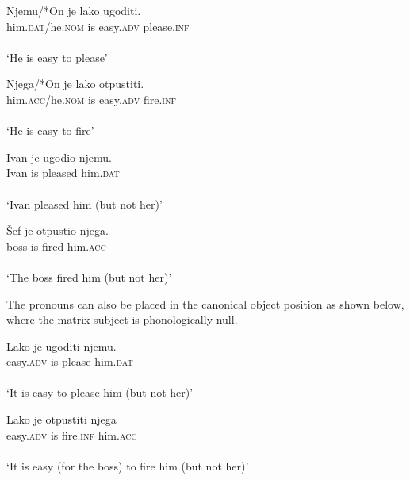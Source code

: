 \documentclass[output=paper,colorlinks,citecolor=brown,
]{langscibook}
\begin{document}
\begin{exe}
\ex \label{32ha}
\begin{xlist}
\ex \label{32aha}
\gll Njemu/*On je lako ugoditi.\\
him.\textsc{dat}/he.\textsc{nom} is easy.\textsc{adv} please.\textsc{inf}\\\\
`He is easy to please’

\ex \label{32bha}
\gll Njega/*On je lako otpustiti.\\
him.\textsc{acc}/he.\textsc{nom} is easy.\textsc{adv} fire.\textsc{inf}\\\\
‘He is easy to fire’

\end{xlist}

\ex \label{33ha}
\begin{xlist}
\ex \label{33aha}
\gll Ivan je ugodio  njemu.\\
Ivan is pleased him.\textsc{dat}\\\\
‘Ivan pleased him (but not her)’

\ex \label{32bha}
\gll Šef je otpustio njega.\\
boss is fired him.\textsc{acc}\\\\
`The boss fired him (but not her)’
\end{xlist}
\end{exe}

The pronouns can also be placed in the canonical object position as shown below, where the matrix subject is phonologically null. 

\begin{exe}
\ex \label{34ha}
\begin{xlist}
\ex \label{34aha}
\gll Lako je ugoditi njemu.\\
easy.\textsc{adv} is please him.\textsc{dat}\\\\
‘It is easy to please him (but not her)’

\ex \label{34bha}
\gll Lako je otpustiti njega\\
easy.\textsc{adv} is fire.\textsc{inf} him.\textsc{acc}\\\\
‘It is easy (for the boss) to fire him (but not her)’

\end{xlist}

\end{exe}
\end{document}
